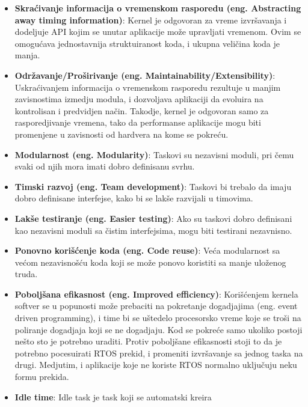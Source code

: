 \documentclass[a4paper,12pt, master]{etf}
\begin{document}
	\begin{itemize}
        \item \textbf{Skra\'{c}ivanje informacija o vremenskom rasporedu
        (eng\@. Abstracting away timing information)}: Kernel je odgovoran za vreme
        izvr\v{s}avanja i dodeljuje API kojim se unutar aplikacije mo\v{z}e
        upravljati vremenom. Ovim se omogu\'{c}ava jednostavnija struktuiranost
        koda, i ukupna veli\v{c}ina koda je manja.
        \item \textbf{Odr\v{z}avanje/Pro\v{s}irivanje
        (eng\@. Maintainability/Extensibility)}: Uskra\'{c}ivanjem informacija o
        vremenskom rasporedu rezultuje u manjim zavisnostima izmedju modula, i
        dozvoljava aplikaciji da evoluira na kontrolisan i predvidjen na\v{c}in.
        Takodje, kernel je odgovoran samo za rasporedjivanje vremena, tako da
        performanse aplikacije mogu biti promenjene u zavisnosti od hardvera na
        kome se pokre\'{c}u.
        \item \textbf{Modularnost (eng\@. Modularity)}: Taskovi su nezavisni moduli,
        pri \v{c}emu svaki od njih mora imati dobro definisanu svrhu.
        \item \textbf{Timski razvoj (eng\@. Team development)}: Taskovi bi trebalo da
        imaju dobro definisane interfejse, kako bi se lak\v{s}e razvijali u
        timovima.
        \item \textbf{Lak\v{s}e testiranje (eng\@. Easier testing)}: Ako su taskovi
        dobro definisani kao nezavisni moduli sa \v{c}istim interfejsima, mogu
        biti testirani nezavnisno.
        \item \textbf{Ponovno kori\v{s}\'{c}enje koda (eng\@. Code reuse)}: Ve\'{c}a
        modularnost sa ve\'{c}om nezavisno\v{s}\'{c}u koda koji se mo\v{z}e
        ponovo koristiti sa manje ulo\v{z}enog truda.
        \item \textbf{Pobolj\v{s}ana efikasnost (eng\@. Improved efficiency)}:
		Kori\v{s}\'{c}enjem kernela softver se u popunosti mo\v{z}e prebaciti
		na pokretanje dogadjajima (eng\@. event driven programming), i time bi
        se u\v{s}tedelo procesorsko vreme koje se tro\v{s}i na poliranje
        dogadjaja koji se ne dogadjaju. Kod se pokre\'{c}e samo ukoliko postoji
        ne\v{s}to sto je potrebno uraditi. Protiv pobolj\v{s}ane efikasnosti
        stoji to da je potrebno pocesuirati RTOS prekid, i promeniti
        izvr\v{s}avanje sa jednog taska na drugi. Medjutim, i aplikacije koje ne
        koriste RTOS normalno uklju\v{c}uju neku formu prekida.
        \item \textbf{Idle time}: Idle task je task koji se automatski kreira

\end{itemize}
\end{document}
